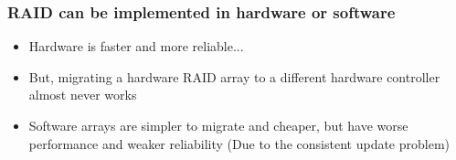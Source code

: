 \documentclass[10pt, oneside]{article}
\begin{document}
\subsubsection{RAID can be implemented in hardware or software}\begin{itemize}
    \item Hardware is faster and more reliable...
    \item But, migrating a hardware RAID array to a different hardware controller almost never works
    \item Software arrays are simpler to migrate and cheaper, but have worse performance and weaker reliability (Due to the consistent update problem)
\end{itemize}


\end{document}
